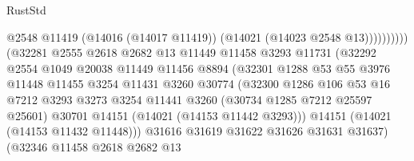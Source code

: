 \begin{lexlean}{RustStd}
\begin{coremodule}
                                              @2548
                                              @11419
                                              (@14016 (@14017 @11419))
                                              (@14021 (@14023 @2548 @13))))))))))
                              (@32281
                                @2555
                                @2618
                                @2682
                                @13
                                @11449
                                @11458
                                @3293
                                @11731
                                (@32292
                                  @2554
                                  @1049
                                  @20038
                                  @11449
                                  @11456
                                  @8894
                                  (@32301
                                    @1288
                                    @53
                                    @55
                                    @3976
                                    @11448
                                    @11455
                                    @3254
                                    @11431
                                    @3260
                                    @30774
                                    (@32300
                                      @1286
                                      @106
                                      @53
                                      @16
                                      @7212
                                      @3293
                                      @3273
                                      @3254
                                      @11441
                                      @3260
                                      (@30734 @1285 @7212 @25597 @25601)
                                      @30701
                                      @14151
                                      (@14021 (@14153 @11442 @3293)))
                                    @14151
                                    (@14021 (@14153 @11432 @11448)))
                                  @31616
                                  @31619
                                  @31622
                                  @31626
                                  @31631
                                  @31637)
                                (@32346
                                  @11458
                                  @2618
                                  @2682
                                  @13

\end{coremodule}
\end{lexlean}
